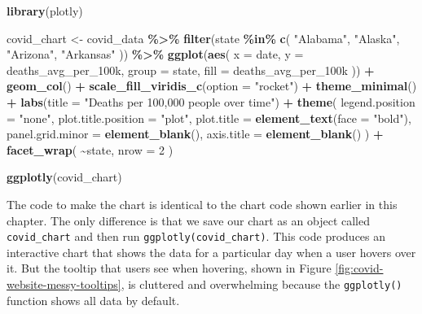 \documentclass[
]{book}
\newenvironment{Shaded}{\begin{snugshade}}{\end{snugshade}}
\newcommand{\AttributeTok}[1]{\textcolor[rgb]{0.13,0.29,0.53}{#1}}
\newcommand{\DecValTok}[1]{\textcolor[rgb]{0.00,0.00,0.81}{#1}}
\newcommand{\FunctionTok}[1]{\textcolor[rgb]{0.13,0.29,0.53}{\textbf{#1}}}
\newcommand{\NormalTok}[1]{#1}
\newcommand{\OtherTok}[1]{\textcolor[rgb]{0.56,0.35,0.01}{#1}}
\newcommand{\SpecialCharTok}[1]{\textcolor[rgb]{0.81,0.36,0.00}{\textbf{#1}}}
\newcommand{\StringTok}[1]{\textcolor[rgb]{0.31,0.60,0.02}{#1}}
\begin{document}
\begin{Shaded}
\begin{Highlighting}[]
\FunctionTok{library}\NormalTok{(plotly)}

\NormalTok{covid\_chart }\OtherTok{\textless{}{-}}\NormalTok{ covid\_data }\SpecialCharTok{\%\textgreater{}\%}
  \FunctionTok{filter}\NormalTok{(state }\SpecialCharTok{\%in\%} \FunctionTok{c}\NormalTok{(}
    \StringTok{"Alabama"}\NormalTok{,}
    \StringTok{"Alaska"}\NormalTok{,}
    \StringTok{"Arizona"}\NormalTok{,}
    \StringTok{"Arkansas"}
\NormalTok{  )) }\SpecialCharTok{\%\textgreater{}\%}
  \FunctionTok{ggplot}\NormalTok{(}\FunctionTok{aes}\NormalTok{(}
    \AttributeTok{x =}\NormalTok{ date,}
    \AttributeTok{y =}\NormalTok{ deaths\_avg\_per\_100k,}
    \AttributeTok{group =}\NormalTok{ state,}
    \AttributeTok{fill =}\NormalTok{ deaths\_avg\_per\_100k}
\NormalTok{  )) }\SpecialCharTok{+}
  \FunctionTok{geom\_col}\NormalTok{() }\SpecialCharTok{+}
  \FunctionTok{scale\_fill\_viridis\_c}\NormalTok{(}\AttributeTok{option =} \StringTok{"rocket"}\NormalTok{) }\SpecialCharTok{+}
  \FunctionTok{theme\_minimal}\NormalTok{() }\SpecialCharTok{+}
  \FunctionTok{labs}\NormalTok{(}\AttributeTok{title =} \StringTok{"Deaths per 100,000 people over time"}\NormalTok{) }\SpecialCharTok{+}
  \FunctionTok{theme}\NormalTok{(}
    \AttributeTok{legend.position =} \StringTok{"none"}\NormalTok{,}
    \AttributeTok{plot.title.position =} \StringTok{"plot"}\NormalTok{,}
    \AttributeTok{plot.title =} \FunctionTok{element\_text}\NormalTok{(}\AttributeTok{face =} \StringTok{"bold"}\NormalTok{),}
    \AttributeTok{panel.grid.minor =} \FunctionTok{element\_blank}\NormalTok{(),}
    \AttributeTok{axis.title =} \FunctionTok{element\_blank}\NormalTok{()}
\NormalTok{  ) }\SpecialCharTok{+}
  \FunctionTok{facet\_wrap}\NormalTok{(}
    \SpecialCharTok{\textasciitilde{}}\NormalTok{state,}
    \AttributeTok{nrow =} \DecValTok{2}
\NormalTok{  )}

\FunctionTok{ggplotly}\NormalTok{(covid\_chart)}
\end{Highlighting}
\end{Shaded}

The code to make the chart is identical to the chart code shown earlier in this chapter. The only difference is that we save our chart as an object called \texttt{covid\_chart} and then run \texttt{ggplotly(covid\_chart)}. This code produces an interactive chart that shows the data for a particular day when a user hovers over it. But the tooltip that users see when hovering, shown in Figure \ref{fig:covid-website-messy-tooltips}, is cluttered and overwhelming because the \texttt{ggplotly()} function shows all data by default.
\end{document}
